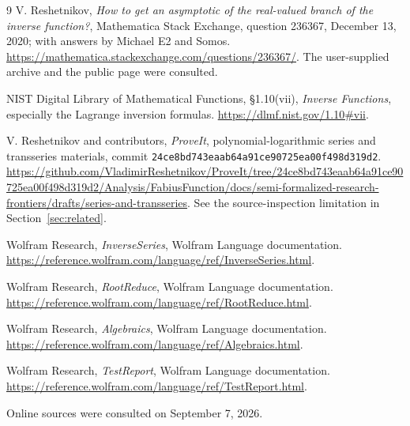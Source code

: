 \documentclass[11pt,a4paper]{article}
\theoremstyle{definition}
\begin{document}
\begin{thebibliography}{9}
V. Reshetnikov, \emph{How to get an asymptotic of the real-valued branch of the
inverse function?}, Mathematica Stack Exchange, question 236367,
December 13, 2020; with answers by Michael E2 and Somos.
\url{https://mathematica.stackexchange.com/questions/236367/}.
The user-supplied archive and the public page were consulted.

NIST Digital Library of Mathematical Functions,
\S1.10(vii), \emph{Inverse Functions}, especially the Lagrange inversion
formulas. \url{https://dlmf.nist.gov/1.10#vii}.

V. Reshetnikov and contributors, \emph{ProveIt}, polynomial-logarithmic
series and transseries materials, commit
\texttt{24ce8bd743eaab64a91ce90725ea00f498d319d2}.
\url{https://github.com/VladimirReshetnikov/ProveIt/tree/24ce8bd743eaab64a91ce90725ea00f498d319d2/Analysis/FabiusFunction/docs/semi-formalized-research-frontiers/drafts/series-and-transseries}.
See the source-inspection limitation in Section~\ref{sec:related}.

Wolfram Research, \emph{InverseSeries}, Wolfram Language documentation.
\url{https://reference.wolfram.com/language/ref/InverseSeries.html}.

Wolfram Research, \emph{RootReduce}, Wolfram Language documentation.
\url{https://reference.wolfram.com/language/ref/RootReduce.html}.

Wolfram Research, \emph{Algebraics}, Wolfram Language documentation.
\url{https://reference.wolfram.com/language/ref/Algebraics.html}.

Wolfram Research, \emph{TestReport}, Wolfram Language documentation.
\url{https://reference.wolfram.com/language/ref/TestReport.html}.
\end{thebibliography}
\noindent\small Online sources were consulted on September 7, 2026.
\end{document}
